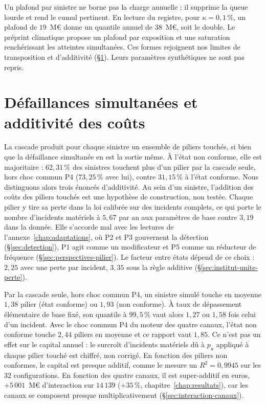 Un plafond par sinistre ne borne pas la charge annuelle : il supprime la queue
lourde et rend le cumul pertinent. En lecture du registre, pour $\kappa=0{,}1\,\%$, un plafond de $19$~M\euro{}
donne un quantile annuel de $38$~M\euro{}, soit le double. Le préprint climatique
\citet{ccrn2026} propose un plafond par exposition et une saturation renchérissant
les atteintes simultanées. Ces formes rejoignent nos limites de transposition et
d'additivité (\S\ref{sec:additivite-couts}). Leurs paramètres synthétiques ne sont
pas repris.

\section{Défaillances simultanées et additivité des coûts}
\label{sec:additivite-couts}

La cascade produit pour chaque sinistre un ensemble de piliers touchés, si bien que la défaillance
simultanée en est la sortie même. À l'état non conforme, elle est majoritaire : $62{,}31\,\%$ des sinistres touchent plus d'un pilier par la cascade seule, hors choc commun P4 ($73{,}25\,\%$ avec lui), contre $31{,}15\,\%$ à l'état conforme. Nous distinguons alors trois
énoncés d'additivité. Au sein d'un sinistre, l'addition des coûts des piliers touchés est une
hypothèse de construction, non testée. Chaque pilier y tire sa perte dans la loi calibrée sur des incidents complets, ce qui porte le nombre d'incidents matériels à $5{,}67$ par an aux paramètres de base contre $3{,}19$ dans la donnée. Elle s'accorde mal avec les lectures de l'annexe~\ref{chap:adaptations}, où P2 et P3 gouvernent la détection (\S\ref{sec:detection}), P1 agit comme un modificateur et P5 comme un réducteur de fréquence (\S\ref{sec:perspectives-pilier}). Le facteur entre états dépend de ce choix : $2{,}25$ avec une perte par incident, $3{,}35$ sous la règle additive (\S\ref{sec:institut-unite-perte}).

Par la cascade seule, hors choc commun P4, un sinistre simulé touche en moyenne $1{,}38$ pilier (état conforme) ou $1{,}93$ (non conforme). À taux de dépassement élémentaire de base fixé, son quantile à $99{,}5\,\%$ vaut alors $1{,}27$ ou $1{,}58$ fois celui d'un incident. Avec le choc commun P4 du moteur des quatre canaux, l'état non conforme touche $2{,}44$ piliers en moyenne et ce rapport vaut $1{,}85$. Ce n'est pas un effet sur le capital annuel : le surcroît d'incidents matériels dû à $p_u$ appliqué à chaque pilier touché est chiffré, non corrigé. En fonction des piliers non conformes, le capital est presque
additif, comme le mesure un $R^2=0{,}9945$ sur les $32$ configurations. En fonction des quatre canaux,
il est super-additif en euros, $+5\,001$~M\euro{} d'interaction sur $14\,139$ ($+35\,\%$,
chapitre~\ref{chap:resultats}), car les canaux se composent presque multiplicativement
(\S\ref{sec:interaction-canaux}).


